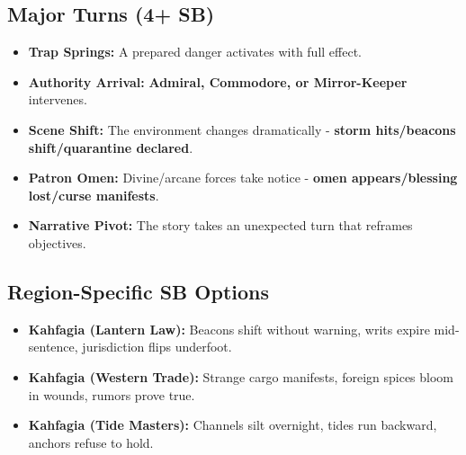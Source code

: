 \subsection*{Major Turns (4+ SB)}
\begin{itemize}
\item \textbf{Trap Springs:} A prepared danger activates with full effect.
\item \textbf{Authority Arrival:} \textbf{Admiral, Commodore, or Mirror-Keeper} intervenes.
\item \textbf{Scene Shift:} The environment changes dramatically - \textbf{storm hits/beacons shift/quarantine declared}.
\item \textbf{Patron Omen:} Divine/arcane forces take notice - \textbf{omen appears/blessing lost/curse manifests}.
\item \textbf{Narrative Pivot:} The story takes an unexpected turn that reframes objectives.
\end{itemize}

\subsection*{Region-Specific SB Options}
\begin{itemize}
\item \textbf{Kahfagia (Lantern Law):} Beacons shift without warning, writs expire mid-sentence, jurisdiction flips underfoot.
\item \textbf{Kahfagia (Western Trade):} Strange cargo manifests, foreign spices bloom in wounds, rumors prove true.
\item \textbf{Kahfagia (Tide Masters):} Channels silt overnight, tides run backward, anchors refuse to hold.
\end{itemize}
